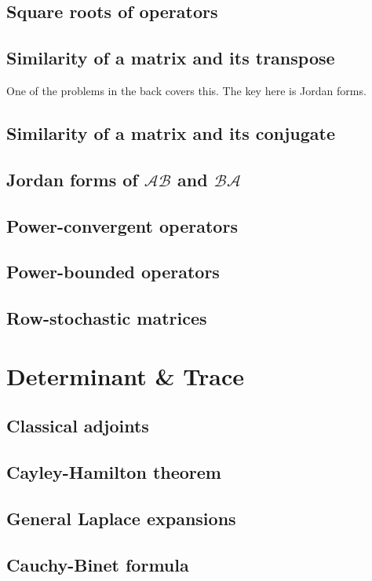 \documentclass{article}
\theoremstyle{definition}
\begin{document}
\subsection{Square roots of operators}



\subsection{Similarity of a matrix and its transpose}

One of the problems in the back covers this. The key here is Jordan forms.

\subsection{Similarity of a matrix and its conjugate}
\subsection{Jordan forms of $\mathcal{AB}$ and $\mathcal{BA}$}
\subsection{Power-convergent operators}
\subsection{Power-bounded operators}
\subsection{Row-stochastic matrices}
\newpage 
\section{Determinant \& Trace}
\subsection{Classical adjoints}
\subsection{Cayley-Hamilton theorem}
\subsection{General Laplace expansions}
\subsection{Cauchy-Binet formula}
\end{document}
